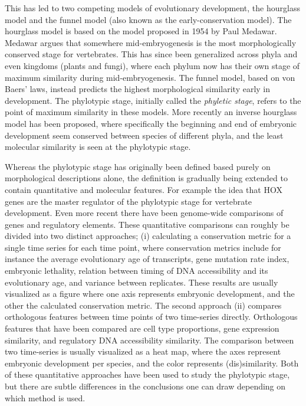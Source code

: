 This has led to two competing models of evolutionary development, the hourglass model and the funnel model (also known as the early-conservation model). The hourglass model is based on the model proposed in 1954 by Paul Medawar\cite{Medawar1954}. Medawar argues that somewhere mid-embryogenesis is the most morphologically conserved stage for vertebrates. This has since been generalized across phyla and even kingdoms (plants\cite{Quint2012} and fungi\cite{Cheng2015}), where each phylum now has their own stage of maximum similarity during mid-embryogenesis. The funnel model, based on von Baers' laws, instead predicts the highest morphological similarity early in development. The phylotypic stage, initially called the \textit{phyletic stage}, refers to the point of maximum similarity in these models\cite{Cohen1963, Seidel1960}. More recently an inverse hourglass model has been proposed, where specifically the beginning and end of embryonic development seem conserved between species of different phyla, and the least molecular similarity is seen at the phylotypic stage\cite{Levin2016}.

Whereas the phylotypic stage has originally been defined based purely on morphological descriptions alone, the definition is gradually being extended to contain quantitative and molecular features. For example the idea that HOX genes are the master regulator of the phylotypic stage for vertebrate development\cite{Duboule1994}. Even more recent there have been genome-wide comparisons of genes and regulatory elements. These quantitative comparisons can roughly be divided into two distinct approaches; (i) calculating a conservation metric for a single time series for each time point, where conservation metrics include for instance the average evolutionary age of transcripts\cite{DomazetLoso2010}, gene mutation rate index\cite{Quint2012, Piasecka2013}, embryonic lethality\cite{Uchida2018}, relation between timing of DNA accessibility and its evolutionary age\cite{Uesaka2019}, and variance between replicates\cite{Liu2020, Uchida2022}. These results are usually visualized as a figure where one axis represents embryonic development, and the other the calculated conservation metric. The second approach (ii) compares orthologous features between time points of two time-series directly. Orthologous features that have been compared are cell type proportions\cite{Mayshar2022}, gene expression similarity\cite{Irie2011, Kalinka2010, Levin2016, marletaz2018}, and regulatory DNA accessibility similarity\cite{Hu2017, Liu2021}. The comparison between two time-series is usually visualized as a heat map, where the axes represent embryonic development per species, and the color represents (dis)similarity. Both of these quantitative approaches have been used to study the phylotypic stage, but there are subtle differences in the conclusions one can draw depending on which method is used. 

